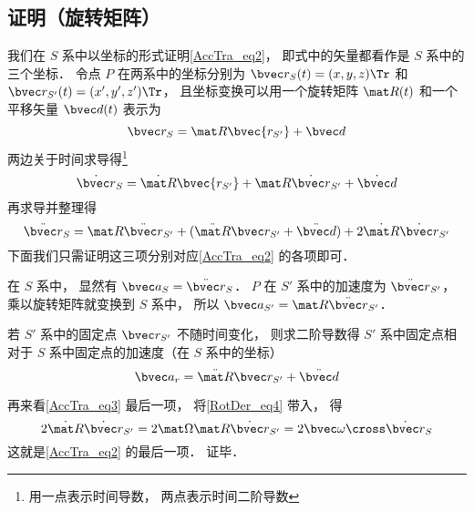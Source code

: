 \subsection{证明（旋转矩阵）}
我们在 $S$ 系中以坐标的形式证明\autoref{AccTra_eq2}， 即式中的矢量都看作是 $S$ 系中的三个坐标． 令点 $P$ 在两系中的坐标分别为 $\bvec r_S(t) = (x, y, z)\Tr$ 和 $\bvec r_{S'}(t) = (x', y', z')\Tr$， 且坐标变换可以用一个旋转矩阵 $\mat R(t)$ 和一个平移矢量 $\bvec d(t)$ 表示为
\begin{equation}
\bvec r_S = \mat R \bvec{r_{S'}} + \bvec d
\end{equation}
两边关于时间求导得\footnote{用一点表示时间导数， 两点表示时间二阶导数}
\begin{equation}
\dot{\bvec r}_S = \dot{\mat R} \bvec{r_{S'}} + \mat R \dot{\bvec r}_{S'}+ \dot{\bvec d}
\end{equation}
再求导并整理得
\begin{equation}\label{AccTra_eq3}
\ddot{\bvec r}_S = \mat R \ddot{\bvec r}_{S'} + (\ddot{\mat R} \bvec r_{S'} + \ddot{\bvec d}) + 2 \dot{\mat R} \dot{\bvec r}_{S'}
\end{equation}
下面我们只需证明这三项分别对应\autoref{AccTra_eq2} 的各项即可．

在 $S$ 系中， 显然有 $\bvec a_S = \ddot{\bvec r}_S$． $P$ 在 $S'$ 系中的加速度为 $\ddot{\bvec r}_{S'}$， 乘以旋转矩阵就变换到 $S$ 系中， 所以 $\bvec a_{S'} = \mat R \ddot{\bvec r}_{S'}$．

若 $S'$ 系中的固定点 $\bvec r_{S'}$ 不随时间变化， 则求二阶导数得 $S'$ 系中固定点相对于 $S$ 系中固定点的加速度（在 $S$ 系中的坐标）
\begin{equation}
\bvec a_r = \ddot{\mat R} \bvec r_{S'} + \ddot{\bvec d}
\end{equation}

再来看\autoref{AccTra_eq3} 最后一项， 将\autoref{RotDer_eq4} 带入， 得
\begin{equation}
2\dot{\mat R} \dot{\bvec r}_{S'} = 2\mat\Omega \mat R \dot{\bvec r}_{S'} = 2\bvec \omega \cross \dot{\bvec r}_S
\end{equation}
这就是\autoref{AccTra_eq2} 的最后一项． 证毕．
